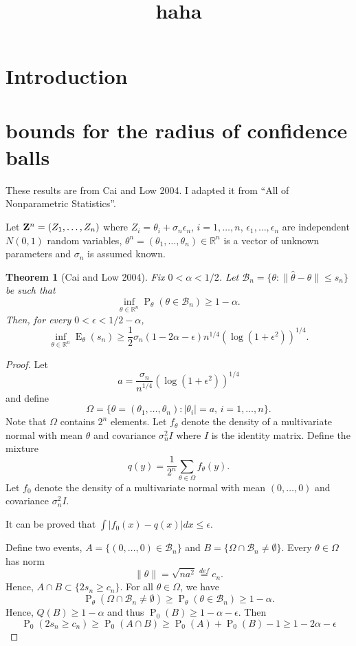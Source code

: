 \documentclass[11pt, letterpaper]{article}
\DeclareMathOperator{\myP}{P}
\DeclareMathOperator{\myE}{E}
\theoremstyle{plain}
\newtheorem{theorem}{\quad\quad Theorem}
\theoremstyle{definition}
\theoremstyle{remark}
\begin{document}
\title{haha}
\maketitle
\section{Introduction}
\section{bounds for the radius of confidence balls}
These results are from Cai and Low 2004.
I adapted it from ``All of Nonparametric Statistics''.

Let $\mathbf{Z}^n=(Z_1,\ldots,Z_n)$ where $Z_{i}=\theta_i+\sigma_n\epsilon_n$, $i=1,\ldots,n$, $\epsilon_1,\ldots,\epsilon_n$ are independent $N(0,1)$ random variables, $\theta^n=(\theta_1,\ldots,\theta_n)\in\mathbb{R}^n$ is a vector of unknown parameters and $\sigma_n$ is assumed known. 
\begin{theorem}[Cai and Low 2004]
    Fix $0<\alpha<1/2$. Let $\mathcal{B}_n=\{\theta:\|\hat{\theta}-\theta\|\leq s_n\}$ be such that
    $$
    \inf_{\theta\in \mathbb{R}^n} \myP_{\theta}(\theta\in \mathcal{B}_n)\geq 1-\alpha.
    $$
    Then, for every $0<\epsilon<1/2-\alpha$,
    $$
    \inf_{\theta\in \mathbb{R}^n}\myE_{\theta}(s_n)\geq \frac{1}{2}\sigma_n(1-2\alpha-\epsilon)n^{1/4}(\log(1+\epsilon^2))^{1/4}.
    $$
\end{theorem}
\begin{proof}
    Let 
    $$
    a=\frac{\sigma_n}{n^{1/4}}(\log(1+\epsilon^2))^{1/4}
    $$
    and define
    $$
    \Omega=\{\theta=(\theta_1,\ldots,\theta_n):|\theta_i|=a,\,i=1,\ldots,n\}.
    $$
    Note that $\Omega$ contains $2^n$ elements. Let $f_{\theta}$ denote the density of a multivariate normal with mean $\theta$ and covariance $\sigma_n^2 I$ where $I$ is the identity matrix.
    Define the mixture
    $$
    q(y)=\frac{1}{2^n}\sum_{\theta\in\Omega}f_{\theta}(y).
    $$
    Let $f_0$ denote the density of a multivariate normal with mean $(0,\ldots,0)$ and covariance $\sigma_n^2 I$.

    It can be proved that $\int |f_0(x)-q(x)|dx\leq \epsilon$.
    
    Define two events, $A=\{(0,\ldots,0)\in \mathcal{B}_n\}$ and $B=\{\Omega\cap \mathcal{B}_n \neq \emptyset\}$.
    Every $\theta\in \Omega$ has norm
    $$
    \|\theta\|=\sqrt{n a^2}\overset{def}{=}c_n.
    $$
    Hence, $A\cap B\subset\{2s_n\geq c_n\}$.
    For all $\theta\in\Omega$, we have
    $$
    \myP_\theta(\Omega\cap\mathcal{B}_n\neq \emptyset)\geq
    \myP_\theta(\theta\in\mathcal{B}_n)\geq 1-\alpha.
    $$
    Hence, $Q(B)\geq 1-\alpha$ and thus $\myP_0(B)\geq 1-\alpha-\epsilon$. Then
    $$
    \myP_0(2s_n\geq c_n)\geq 
    \myP_0(A\cap B)\geq \myP_0(A)+\myP_0(B)-1
    \geq 1-2\alpha-\epsilon
    $$

\end{proof}
\end{document}
